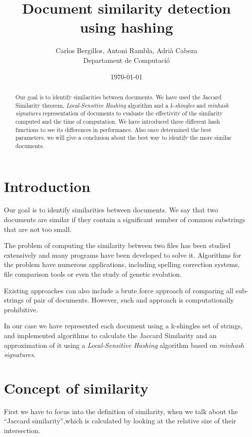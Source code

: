 \documentclass[12pt]{article}
\author{Carlos Bergillos, Antoni Rambla, Adrià Cabeza\\ Departament de Computació}
\title{Document similarity detection using hashing }
\date{\today}
\begin{document}
  \maketitle  

  \vspace{2cm}
	\begin{abstract}

Our goal is to identify similarities between documents. We have used the Jaccard Similarity theorem,  \textit{Local-Sensitive Hashing} algorithm
 and a \textit{k-shingles} and \textit{minhash signatures} representation of documents to evaluate the effectivity of the similarity computed and the time of computation. We have introduced three different hash functions to see its differences in performance.  Also  once determined the best parameters, we will give a conclusion about the best way to identify the more similar documents. 
\end{abstract}

\newpage
\tableofcontents
\newpage

\section{Introduction}

Our goal is to identify similarities between documents. We say that two documents are similar if they contain a significant number of common substrings that are not too small. 

The problem of computing the similarity between two files has been studied extensively and many programs have been developed to solve it. Algorithms for the problem have numerous applications, including spelling correction systems, file comparison tools or even the study of genetic evolution.

 Existing approaches can also include a brute force approach of comparing all sub-strings of pair of documents. However, such and approach is computationally prohibitive. 

 In our case we have represented each document using a k-shingles set of strings, and implemented algorithms to calculate the Jaccard Similarity and an approximation of it using a \textit{Local-Sensitive Hashing} algorithm
 based on \textit{minhash signatures}.


 
\section{Concept of similarity} \label{similarity}
First we have to focus into the definition of similarity, when we talk about the ``Jaccard similarity'',which is calculated by looking at the relative size of their intersection. 
\end{document}

